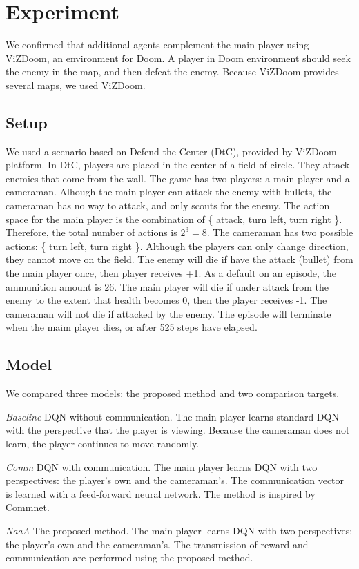 \section{Experiment}
We confirmed that additional agents complement the main player using ViZDoom, an environment for Doom.
A player in Doom environment should seek the enemy in the map, and then defeat the enemy.
Because ViZDoom provides several maps, we used ViZDoom.

\subsection{Setup}
We used a scenario based on Defend the Center (DtC), provided by ViZDoom platform.
In DtC, players are placed in the center of a field of circle. They attack enemies that come from the wall.
The game has two players: a main player and a cameraman.
Alhough the main player can attack the enemy with bullets, 
the cameraman has no way to attack, and only scouts for the enemy.
The action space for the main player is the combination of \{ attack, turn left, turn right \}. Therefore, the total number of actions is $2^3 = 8$.
The cameraman has two possible actions: \{ turn left, turn right \}.
Although the players can only change direction, they cannot move on the field.
The enemy will die if have the attack (bullet) from the main player once, then player receives +1.
As a default on an episode, the ammunition amount is 26.
The main player will die if under attack from the enemy to the extent that health becomes 0, then the player receives -1.
The cameraman will not die if attacked by the enemy.
The episode will terminate when the maim player dies, or after 525 steps have elapsed.

\subsection{Model}
We compared three models: the proposed method and two comparison targets.

{\em Baseline} DQN without communication. The main player learns standard DQN with the perspective that the player is viewing.
Because the cameraman does not learn, the player continues to move randomly.

{\em Comm} DQN with communication. The main player learns DQN with two perspectives: the player's own and the cameraman's.
The communication vector is learned with a feed-forward neural network. The method is inspired by Commnet.

{\em NaaA} The proposed method. The main player learns DQN with two perspectives: the player's own and the cameraman's.
The transmission of reward and communication are performed using the proposed method.

